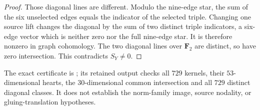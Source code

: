 \begin{proof}
Those diagonal lines are different. Modulo the nine-edge star,
the sum of the six unselected edges equals the indicator of the
selected triple. Changing one source lift changes the diagonal by
the sum of two distinct triple indicators, a six-edge vector which
is neither zero nor the full nine-edge star. It is therefore nonzero
in graph cohomology. The two diagonal lines over $\mathbf F_2$ are
distinct, so have zero intersection. This contradicts $S_Y\ne0$.
\end{proof}

The exact certificate is
; its retained
output checks all $729$ kernels, their $53$-dimensional hearts, the
$30$-dimensional common intersection and all $729$ distinct diagonal
classes. It does not establish the norm-family image, source nodality,
or gluing-translation hypotheses.
